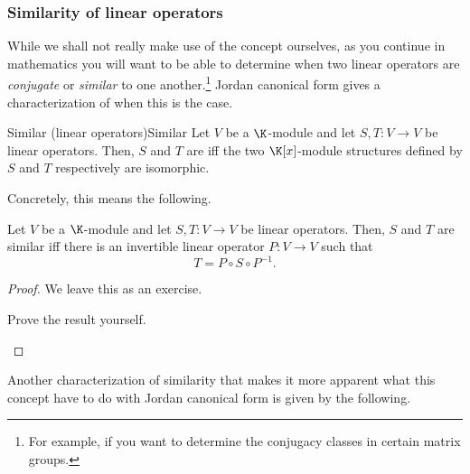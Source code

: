\subsubsection{Similarity of linear operators}

While we shall not really make use of the concept ourselves, as you continue in mathematics you will want to be able to determine when two linear operators are \emph{conjugate} or \emph{similar} to one another.\footnote{For example, if you want to determine the conjugacy classes in certain matrix groups.}  Jordan canonical form gives a characterization of when this is the case.
\begin{dfn}{Similar (linear operators)}{Similar}
	Let $V$ be a $\K$-module and let $S,T\colon V\rightarrow V$ be linear operators.  Then, $S$ and $T$ are  iff the two $\K [x]$-module structures defined by $S$ and $T$ respectively are isomorphic.
\end{dfn}
Concretely, this means the following.
\begin{prp}{}{}
	Let $V$ be a $\K$-module and let $S,T\colon V\rightarrow V$ be linear operators.  Then, $S$ and $T$ are similar iff there is an invertible linear operator $P\colon V\rightarrow V$ such that
	\begin{equation}
		T=P\circ S\circ P^{-1}.
	\end{equation}
	\begin{proof}
		We leave this as an exercise.
		\begin{exr}[breakable=false]{}{}
			Prove the result yourself.
		\end{exr}
	\end{proof}
\end{prp}
Another characterization of similarity that makes it more apparent what this concept have to do with Jordan canonical form is given by the following.
